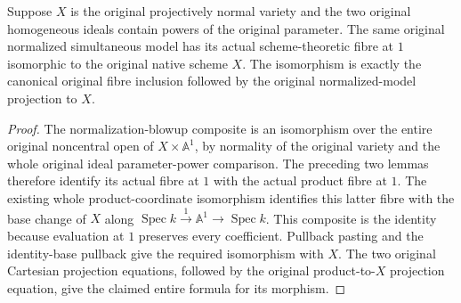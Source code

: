 \begin{theorem}
\label{thm:pl-original-normalized-fibre-one-variety}
\leanok
{}
Suppose $X$ is the original projectively normal variety and the two original
homogeneous ideals contain powers of the original parameter. The same original
normalized simultaneous model has its actual scheme-theoretic fibre at $1$
isomorphic to the original native scheme $X$. The isomorphism is exactly the
canonical original fibre inclusion followed by the original normalized-model
projection to $X$.
\end{theorem}
\begin{proof}
The normalization-blowup composite is an isomorphism over the entire original
noncentral open of $X\times\mathbb A^1$, by normality of the original variety
and the whole original ideal parameter-power comparison. The preceding two
lemmas therefore identify its actual fibre at $1$ with the actual product
fibre at $1$. The existing whole product-coordinate isomorphism identifies
this latter fibre with the base change of $X$ along
$\operatorname{Spec}k\xrightarrow{1}\mathbb A^1\to\operatorname{Spec}k$.
This composite is the identity because evaluation at $1$ preserves every
coefficient. Pullback pasting and the identity-base pullback give the required
isomorphism with $X$. The two original Cartesian projection equations, followed
by the original product-to-$X$ projection equation, give the claimed entire
formula for its morphism.
\end{proof}

